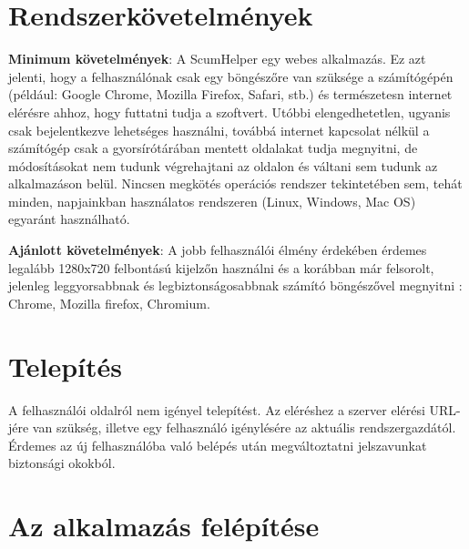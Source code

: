\section{Rendszerkövetelmények} %

\textbf{Minimum követelmények}: A ScumHelper egy webes alkalmazás. Ez azt jelenti, hogy a felhasználónak csak egy böngészőre van szüksége a számítógépén (például: Google Chrome, Mozilla Firefox, Safari, stb.) és természetesn internet elérésre ahhoz, hogy futtatni tudja a szoftvert. Utóbbi elengedhetetlen, ugyanis csak bejelentkezve lehetséges használni, továbbá internet kapcsolat nélkül a számítógép csak a gyorsírótárában mentett oldalakat tudja megnyitni, de módosításokat nem tudunk végrehajtani az oldalon és váltani sem tudunk az alkalmazáson belül. Nincsen megkötés operációs rendszer tekintetében sem, tehát minden, napjainkban használatos rendszeren (Linux, Windows, Mac OS) egyaránt használható.  

\textbf{Ajánlott követelmények}: A jobb felhasználói élmény érdekében érdemes legalább 1280x720 felbontású kijelzőn használni és a korábban már felsorolt, jelenleg leggyorsabbnak és legbiztonságosabbnak számító böngészővel megnyitni : Chrome, Mozilla firefox, Chromium.

\section{Telepítés}

A felhasználói oldalról nem igényel telepítést. Az eléréshez a szerver elérési URL-jére van szükség, illetve egy felhasználó igénylésére az aktuális rendszergazdától. Érdemes az új felhasználóba való belépés után megváltoztatni jelszavunkat biztonsági okokból.

 \section{Az alkalmazás felépítése}

